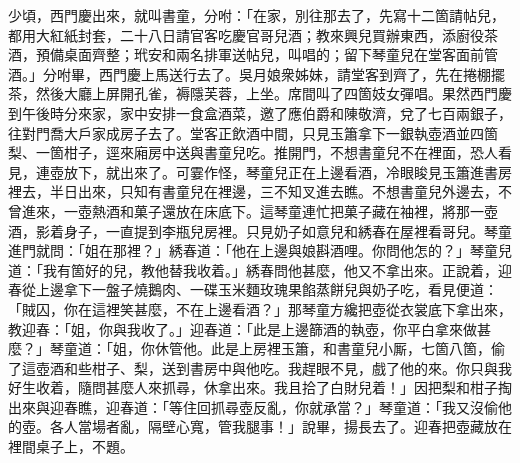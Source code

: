 少頃，西門慶出來，就叫書童，分咐：「在家，別往那去了，先寫十二箇請帖兒，都用大紅紙封套，二十八日請官客吃慶官哥兒酒；教來興兒買辦東西，添廚役茶酒，預備桌面齊整；玳安和兩名排軍送帖兒，叫唱的；留下琴童兒在堂客面前管酒。」分咐畢，西門慶上馬送行去了。吳月娘衆姊妹，請堂客到齊了，先在捲棚擺茶，然後大廳上屏開孔雀，褥隱芙蓉，上坐。席間叫了四箇妓女彈唱。果然西門慶到午後時分來家，家中安排一食盒酒菜，邀了應伯爵和陳敬濟，兌了七百兩銀子，往對門喬大戶家成房子去了。堂客正飲酒中間，只見玉簫拿下一銀執壺酒並四箇梨、一箇柑子，逕來廂房中送與書童兒吃。推開門，不想書童兒不在裡面，恐人看見，連壺放下，就出來了。可霎作怪，琴童兒正在上邊看酒，冷眼睃見玉簫進書房裡去，半日出來，只知有書童兒在裡邊，三不知叉進去瞧。不想書童兒外邊去，不曾進來，一壺熱酒和菓子還放在床底下。這琴童連忙把菓子藏在袖裡，將那一壺酒，影着身子，一直提到李瓶兒房裡。只見奶子如意兒和綉春在屋裡看哥兒。琴童進門就問：「姐在那裡？」綉春道：「他在上邊與娘斟酒哩。你問他怎的？」琴童兒道：「我有箇好的兒，教他替我收着。」綉春問他甚麼，他又不拿出來。正說着，迎春從上邊拿下一盤子燒鵝肉、一碟玉米麵玫瑰果餡蒸餅兒與奶子吃，看見便道：「賊囚，你在這裡笑甚麼，不在上邊看酒？」那琴童方纔把壺從衣裳底下拿出來，教迎春：「姐，你與我收了。」迎春道：「此是上邊篩酒的執壺，你平白拿來做甚麼？」琴童道：「姐，你休管他。此是上房裡玉簫，和書童兒小厮，七箇八箇，偷了這壺酒和些柑子、梨，送到書房中與他吃。我趕眼不見，戲了他的來。你只與我好生收着，隨問甚麼人來抓尋，休拿出來。我且拾了白財兒着！」因把梨和柑子掏出來與迎春瞧，迎春道：「等住回抓尋壺反亂，你就承當？」琴童道：「我又沒偷他的壺。各人當場者亂，隔壁心寬，管我腿事！」說畢，揚長去了。迎春把壺藏放在裡間桌子上，不題。

